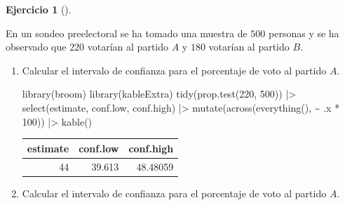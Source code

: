 \documentclass[
  a4paper,
]{scrreport}
\newenvironment{Shaded}{\begin{snugshade}}{\end{snugshade}}
\newcommand{\DecValTok}[1]{\textcolor[rgb]{0.68,0.00,0.00}{#1}}
\newcommand{\FunctionTok}[1]{\textcolor[rgb]{0.28,0.35,0.67}{#1}}
\newcommand{\NormalTok}[1]{\textcolor[rgb]{0.00,0.23,0.31}{#1}}
\newcommand{\SpecialCharTok}[1]{\textcolor[rgb]{0.37,0.37,0.37}{#1}}
\theoremstyle{definition}
\newtheorem{exercise}{Ejercicio}[chapter]
\theoremstyle{remark}
\begin{document}
\begin{exercise}[]\protect\hypertarget{exr-intencion-voto}{}\label{exr-intencion-voto}

En un sondeo preelectoral se ha tomado una muestra de \(500\) personas y
se ha observado que \(220\) votarían al partido \(A\) y \(180\) votarían
al partido \(B\).

\begin{enumerate}
\def\labelenumi{\alph{enumi}.}
\item
  Calcular el intervalo de confianza para el porcentaje de voto al
  partido \(A\).

  \begin{tcolorbox}[enhanced jigsaw, toprule=.15mm, rightrule=.15mm, arc=.35mm, colback=white, colbacktitle=quarto-callout-tip-color!10!white, toptitle=1mm, left=2mm, colframe=quarto-callout-tip-color-frame, opacityback=0, breakable, opacitybacktitle=0.6, bottomtitle=1mm, titlerule=0mm, title=\textcolor{quarto-callout-tip-color}{\faLightbulb}\hspace{0.5em}{Solución}, bottomrule=.15mm, coltitle=black, leftrule=.75mm]

\begin{Shaded}
\begin{Highlighting}[]
\FunctionTok{library}\NormalTok{(broom)}
\FunctionTok{library}\NormalTok{(kableExtra)}
\FunctionTok{tidy}\NormalTok{(}\FunctionTok{prop.test}\NormalTok{(}\DecValTok{220}\NormalTok{, }\DecValTok{500}\NormalTok{)) }\SpecialCharTok{|\textgreater{}} 
\FunctionTok{select}\NormalTok{(estimate, conf.low, conf.high) }\SpecialCharTok{|\textgreater{}} 
\FunctionTok{mutate}\NormalTok{(}\FunctionTok{across}\NormalTok{(}\FunctionTok{everything}\NormalTok{(), }\SpecialCharTok{\textasciitilde{}}\NormalTok{ .x }\SpecialCharTok{*} \DecValTok{100}\NormalTok{)) }\SpecialCharTok{|\textgreater{}} 
\FunctionTok{kable}\NormalTok{()}
\end{Highlighting}
\end{Shaded}

  \begin{tabular}{r|r|r}
  \hline
  estimate & conf.low & conf.high\\
  \hline
  44 & 39.613 & 48.48059\\
  \hline
  \end{tabular}

  \end{tcolorbox}
\item
  Calcular el intervalo de confianza para el porcentaje de voto al
  partido \(A\).


\end{enumerate}
\end{exercise}
\end{document}
